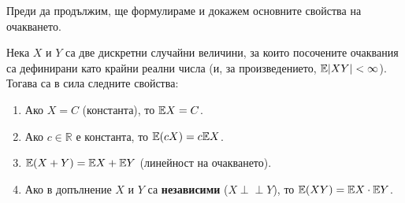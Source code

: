 Преди да продължим, ще формулираме и докажем основните свойства на очакването.

\begin{keylem}
Нека $X$ и $Y$ са две дискретни случайни величини, за които посочените очаквания са
дефинирани като крайни реални числа (и, за произведението, $\mathbb{E}|XY|<\infty$). Тогава
са в сила следните свойства:
\begin{enumerate}
    \item[а)] Ако $X = C$ (константа), то $\mathbb{E} X = C$.
    \item[б)] Ако $c \in \mathbb{R}$ е константа, то $\mathbb{E}(cX) = c\mathbb{E} X$.
    \item[в)] $\mathbb{E}(X + Y) = \mathbb{E} X + \mathbb{E} Y$ (линейност на очакването).
    \item[г)] Ако в допълнение $X$ и $Y$ са \textbf{независими} ($X \perp\!\!\!\perp Y$), то $\mathbb{E}(XY) = \mathbb{E} X \cdot \mathbb{E} Y$.
\end{enumerate}
\end{keylem}

